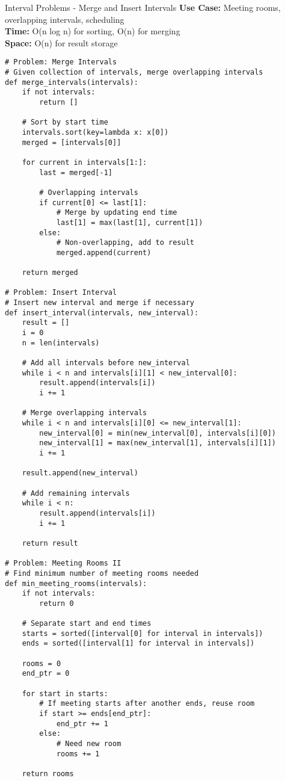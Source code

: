 \documentclass[10pt,a4paper]{article}
\begin{document}
\begin{patternbox}{Interval Problems - Merge and Insert Intervals}
\textbf{Use Case:} Meeting rooms, overlapping intervals, scheduling\\
\textbf{Time:} O(n log n) for sorting, O(n) for merging\\
\textbf{Space:} O(n) for result storage
\end{patternbox}

\begin{lstlisting}
# Problem: Merge Intervals
# Given collection of intervals, merge overlapping intervals
def merge_intervals(intervals):
    if not intervals:
        return []

    # Sort by start time
    intervals.sort(key=lambda x: x[0])
    merged = [intervals[0]]

    for current in intervals[1:]:
        last = merged[-1]

        # Overlapping intervals
        if current[0] <= last[1]:
            # Merge by updating end time
            last[1] = max(last[1], current[1])
        else:
            # Non-overlapping, add to result
            merged.append(current)

    return merged

# Problem: Insert Interval
# Insert new interval and merge if necessary
def insert_interval(intervals, new_interval):
    result = []
    i = 0
    n = len(intervals)

    # Add all intervals before new_interval
    while i < n and intervals[i][1] < new_interval[0]:
        result.append(intervals[i])
        i += 1

    # Merge overlapping intervals
    while i < n and intervals[i][0] <= new_interval[1]:
        new_interval[0] = min(new_interval[0], intervals[i][0])
        new_interval[1] = max(new_interval[1], intervals[i][1])
        i += 1

    result.append(new_interval)

    # Add remaining intervals
    while i < n:
        result.append(intervals[i])
        i += 1

    return result

# Problem: Meeting Rooms II
# Find minimum number of meeting rooms needed
def min_meeting_rooms(intervals):
    if not intervals:
        return 0

    # Separate start and end times
    starts = sorted([interval[0] for interval in intervals])
    ends = sorted([interval[1] for interval in intervals])

    rooms = 0
    end_ptr = 0

    for start in starts:
        # If meeting starts after another ends, reuse room
        if start >= ends[end_ptr]:
            end_ptr += 1
        else:
            # Need new room
            rooms += 1

    return rooms
\end{lstlisting}
\end{document}
